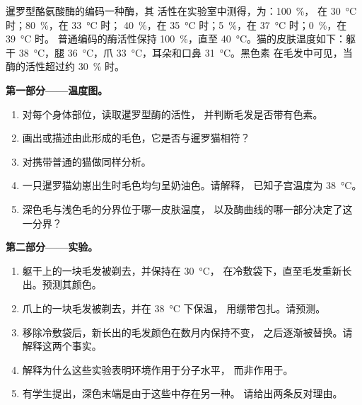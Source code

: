 \begin{problem}
\label{pb:g11:enzymes-and-phenotype:1}
暹罗型酪氨酸酶的编码一种酶，其
活性在实验室中测得，为：\qty{100}{\percent}，
在 \qty{30}{\celsius} 时；\qty{80}{\percent}，在 \qty{33}{\celsius} 时；
\qty{40}{\percent}，在 \qty{35}{\celsius} 时；\qty{5}{\percent}，在
\qty{37}{\celsius} 时；\qty{0}{\percent}，在 \qty{39}{\celsius} 时。
普通编码的酶活性保持 \qty{100}{\percent}，直至
\qty{40}{\celsius}。猫的皮肤温度如下：躯干
\qty{38}{\celsius}，腿 \qty{36}{\celsius}，爪
\qty{33}{\celsius}，耳朵和口鼻 \qty{31}{\celsius}。黑色素
在毛发中可见，当酶的活性超过约
\qty{30}{\percent} 时。

\medskip
\noindent\textbf{第一部分——温度图。}
\begin{enumerate}
  \item 对每个身体部位，读取暹罗型酶的活性，
        并判断毛发是否带有色素。
  \item 画出或描述由此形成的毛色，它是否与暹罗猫相符？
  \item 对携带普通的猫做同样分析。
  \item 一只暹罗猫幼崽出生时毛色均匀呈奶油色。请解释，
        已知子宫温度为 \qty{38}{\celsius}。
  \item 深色毛与浅色毛的分界位于哪一皮肤温度，
        以及酶曲线的哪一部分决定了这一分界？
\end{enumerate}

\medskip
\noindent\textbf{第二部分——实验。}
\begin{enumerate}[resume]
  \item 躯干上的一块毛发被剃去，并保持在 \qty{30}{\celsius}，
        在冷敷袋下，直至毛发重新长出。预测其颜色。
  \item 爪上的一块毛发被剃去，并在 \qty{38}{\celsius} 下保温，
        用绷带包扎。请预测。
  \item 移除冷敷袋后，新长出的毛发颜色在数月内保持不变，
        之后逐渐被替换。请解释这两个事实。
  \item 解释为什么这些实验表明环境作用于分子水平，
        而非作用于。
  \item 有学生提出，深色末端是由于这些中存在另一种。
        请给出两条反对理由。
\end{enumerate}


\end{problem}
